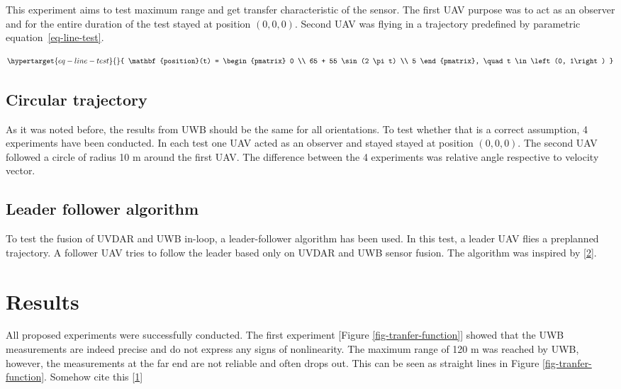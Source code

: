 \documentclass[twoside]{ctustyle/ctuthesis}
\theoremstyle{plain}
\theoremstyle{definition}
\theoremstyle{note}
\begin{document}
This experiment aims to test maximum range and get transfer
characteristic of the sensor. The first UAV purpose was to act as an
observer and for the entire duration of the test stayed at position
\(\left(0, 0, 0\right)\). Second UAV was flying in a trajectory
predefined by parametric equation~\ref{eq-line-test}.

\begin{equation}\protect\hypertarget{eq-line-test}{}{
    \mathbf{position}(t) = \begin{pmatrix} 0 \\ 65 + 55 \sin (2 \pi t) \\ 5 \end{pmatrix}, \quad t \in \left(0, 1\right)
}\label{eq-line-test}\end{equation}

\hypertarget{circular-trajectory}{%
\subsection{Circular trajectory}\label{circular-trajectory}}

As it was noted before, the results from UWB should be the same for all
orientations. To test whether that is a correct assumption, 4
experiments have been conducted. In each test one UAV acted as an
observer and stayed stayed at position \(\left(0, 0, 0\right)\). The
second UAV followed a circle of radius 10 m around the first UAV. The
difference between the 4 experiments was relative angle respective to
velocity vector.

\hypertarget{leader-follower-algorithm}{%
\subsection{Leader follower algorithm}\label{leader-follower-algorithm}}

To test the fusion of UVDAR and UWB in-loop, a leader-follower algorithm
has been used. In this test, a leader UAV flies a preplanned trajectory.
A follower UAV tries to follow the leader based only on UVDAR and UWB
sensor fusion. The algorithm was inspired by
{[}\protect\hyperlink{ref-mrs:uvdar}{2}{]}.

\hypertarget{results}{%
\section{Results}\label{results}}

All proposed experiments were successfully conducted. The first
experiment {[}Figure \ref{fig-tranfer-function}{]} showed that the UWB
measurements are indeed precise and do not express any signs of
nonlinearity. The maximum range of 120 m was reached by UWB, however,
the measurements at the far end are not reliable and often drops out.
This can be seen as straight lines in Figure \ref{fig-tranfer-function}.
Somehow cite this {[}\protect\hyperlink{ref-qorvo:aps011}{1}{]}
\end{document}
